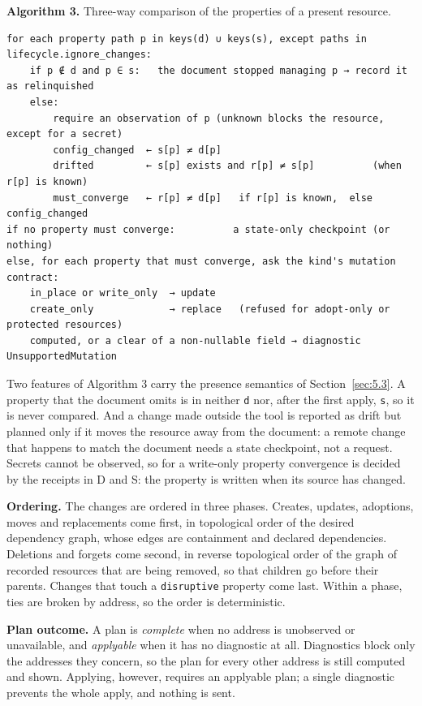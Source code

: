 \textbf{Algorithm 3.} Three-way comparison of the properties of a present resource.

\begin{lstlisting}
for each property path p in keys(d) ∪ keys(s), except paths in lifecycle.ignore_changes:
    if p ∉ d and p ∈ s:   the document stopped managing p → record it as relinquished
    else:
        require an observation of p (unknown blocks the resource, except for a secret)
        config_changed  ← s[p] ≠ d[p]
        drifted         ← s[p] exists and r[p] ≠ s[p]          (when r[p] is known)
        must_converge   ← r[p] ≠ d[p]   if r[p] is known,  else config_changed
if no property must converge:          a state-only checkpoint (or nothing)
else, for each property that must converge, ask the kind's mutation contract:
    in_place or write_only  → update
    create_only             → replace   (refused for adopt-only or protected resources)
    computed, or a clear of a non-nullable field → diagnostic UnsupportedMutation
\end{lstlisting}

Two features of Algorithm 3 carry the presence semantics of Section~\ref{sec:5.3}. A property that the
document omits is in neither \texttt{d} nor, after the first apply, \texttt{s}, so it is never compared. And a
change made outside the tool is reported as drift but planned only if it moves the resource away
from the document: a remote change that happens to match the document needs a state checkpoint, not
a request. Secrets cannot be observed, so for a write-only property convergence is decided by the
receipts in D and S: the property is written when its source has changed.

\textbf{Ordering.} The changes are ordered in three phases. Creates, updates, adoptions, moves and
replacements come first, in topological order of the desired dependency graph, whose edges are
containment and declared dependencies. Deletions and forgets come second, in reverse topological
order of the graph of recorded resources that are being removed, so that children go before their
parents. Changes that touch a \texttt{disruptive} property come last. Within a phase, ties are broken by
address, so the order is deterministic.

\textbf{Plan outcome.} A plan is \emph{complete} when no address is unobserved or unavailable, and \emph{applyable}
when it has no diagnostic at all. Diagnostics block only the addresses they concern, so the plan for
every other address is still computed and shown. Applying, however, requires an applyable plan; a
single diagnostic prevents the whole apply, and nothing is sent.

